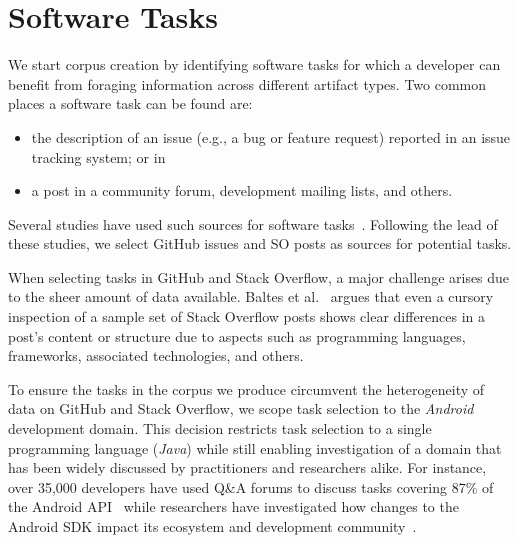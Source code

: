\section{Software Tasks}
\label{cp4:corpus-tasks}


We start corpus creation by identifying software tasks for which a 
developer can benefit
from
foraging information across different artifact types. 
Two common places a software task can be found are:





\begin{itemize}
    \item the description of an issue
    (e.g., a bug or feature request) reported in an issue tracking system; or in
    \item a post in a community forum, development mailing lists, and others.
\end{itemize}

Several studies have used such sources for software tasks~\cite{Arya2019, baltes2019, nadi2020, Xu2017}. Following the lead
of these studies, we select GitHub issues and \acf{SO} posts as sources for potential tasks.

When selecting tasks in GitHub and Stack Overflow, a major challenge arises due to the sheer amount of data available.
Baltes et al.~\cite{baltes2019} argues that even a cursory inspection of a sample set
of Stack Overflow posts shows clear differences in a post's content or structure due to aspects such as programming languages, frameworks, associated technologies, and others.

To ensure the tasks in the corpus we produce
circumvent the heterogeneity of data on GitHub and Stack Overflow, we scope task selection to the \textit{Android} development domain. This decision
restricts task selection to a single programming language (\textit{Java})
while still enabling investigation of a domain that has been
widely discussed by practitioners and researchers alike.
For instance, over 35,000 developers have used Q\&A forums to discuss tasks covering 87\% of the Android API~\cite{parnin2012}
while researchers have investigated how changes to the Android SDK impact its ecosystem and development community~\cite{linares2014, bavota2014b, mcdonnell2013}.




